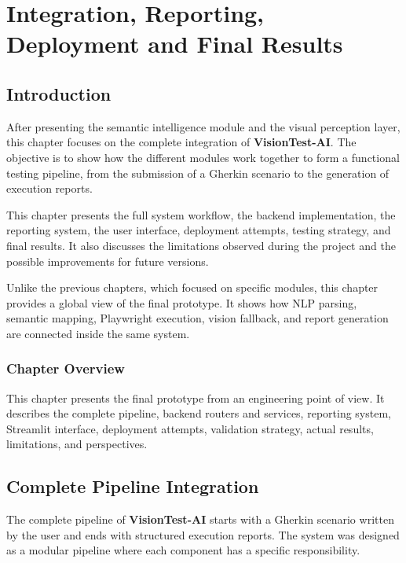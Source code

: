 \chapter{Integration, Reporting, Deployment and Final Results}
\label{chap:integration_results}
\minitoc
\newpage

\section{Introduction}
\label{sec:ch5_intro}

After presenting the semantic intelligence module and the visual perception layer, this chapter focuses on the complete integration of \textbf{VisionTest-AI}. The objective is to show how the different modules work together to form a functional testing pipeline, from the submission of a Gherkin scenario to the generation of execution reports.

This chapter presents the full system workflow, the backend implementation, the reporting system, the user interface, deployment attempts, testing strategy, and final results. It also discusses the limitations observed during the project and the possible improvements for future versions.

Unlike the previous chapters, which focused on specific modules, this chapter provides a global view of the final prototype. It shows how NLP parsing, semantic mapping, Playwright execution, vision fallback, and report generation are connected inside the same system.

\subsection*{Chapter Overview}
{}

This chapter presents the final prototype from an engineering point of view. It describes the complete pipeline, backend routers and services, reporting system, Streamlit interface, deployment attempts, validation strategy, actual results, limitations, and perspectives.

\section{Complete Pipeline Integration}
\label{sec:complete_pipeline}

The complete pipeline of \textbf{VisionTest-AI} starts with a Gherkin scenario written by the user and ends with structured execution reports. The system was designed as a modular pipeline where each component has a specific responsibility.

